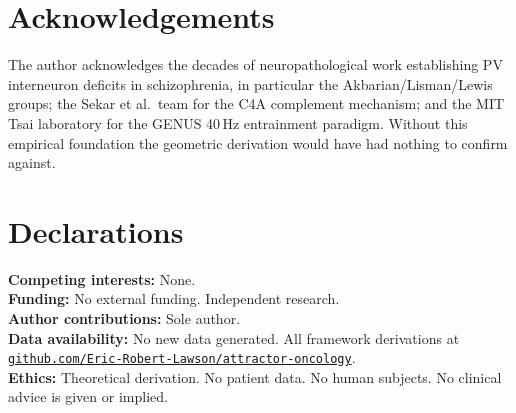 \documentclass[12pt,a4paper]{article}
\begin{document}
\section*{Acknowledgements}

The author acknowledges the decades of neuropathological
work establishing PV interneuron deficits in schizophrenia,
in particular the Akbarian/Lisman/Lewis groups; the Sekar
et al.\ team for the C4A complement mechanism; and the MIT
Tsai laboratory for the GENUS 40\,Hz entrainment
paradigm. Without this empirical foundation the geometric
derivation would have had nothing to confirm against.

\section*{Declarations}

\noindent\textbf{Competing interests:} None.\\
\textbf{Funding:} No external funding. Independent research.\\
\textbf{Author contributions:} Sole author.\\
\textbf{Data availability:} No new data generated. All
framework derivations at
\href{https://github.com/Eric-Robert-Lawson/attractor-oncology}%
{\texttt{github.com/Eric-Robert-Lawson/attractor-oncology}}.\\
\textbf{Ethics:} Theoretical derivation. No patient data.
No human subjects. No clinical advice is given or implied.
\end{document}
